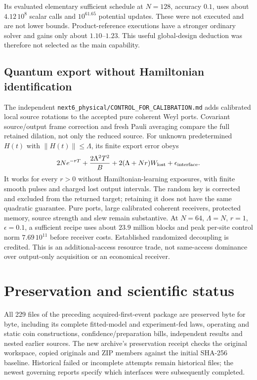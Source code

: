 Its evaluated elementary sufficient schedule at $N=128$, accuracy $0.1$, uses about $4.12\,10^8$ scalar calls and $10^{61.65}$ potential updates. These were not executed and are not lower bounds. Product-reference executions have a stronger ordinary solver and gains only about $1.10$--$1.23$. This useful global-design deduction was therefore not selected as the main capability.

\subsection{Quantum export without Hamiltonian identification}
The independent \texttt{next6\_physical/CONTROL\_FOR\_CALIBRATION.md} adds calibrated local source rotations to the accepted pure coherent Weyl ports. Covariant source/output frame correction and fresh Pauli averaging compare the full retained dilation, not only the reduced source. For unknown predetermined $H(t)$ with $\|H(t)\|\le\Lambda$, its finite export error obeys
\[
 2Ne^{-rT}+\frac{2\Lambda^2T^2}{B}
       +2(\Lambda+Nr)W_{\rm lost}+\epsilon_{\rm interface}.
\]
It works for every $r>0$ without Hamiltonian-learning exposures, with finite smooth pulses and charged lost output intervals. The random key is corrected and excluded from the returned target; retaining it does not have the same quadratic guarantee. Pure ports, large calibrated coherent receivers, protected memory, source strength and slew remain substantive. At $N=64$, $\Lambda=N$, $r=1$, $\epsilon=0.1$, a sufficient recipe uses about $23.9$ million blocks and peak per-site control norm $7.69\,10^{11}$ before receiver costs. Established randomized decoupling is credited. This is an additional-access resource trade, not same-access dominance over output-only acquisition or an economical receiver.

\section{Preservation and scientific status}
All 229 files of the preceding acquired-first-event package are preserved byte for byte, including its complete fitted-model and experiment-fed laws, operating and static coin constructions, confidence/preparation bills, independent results and nested earlier sources. The new archive's preservation receipt checks the original workspace, copied originals and ZIP members against the initial SHA-256 baseline. Historical failed or incomplete attempts remain historical files; the newest governing reports specify which interfaces were subsequently completed.

